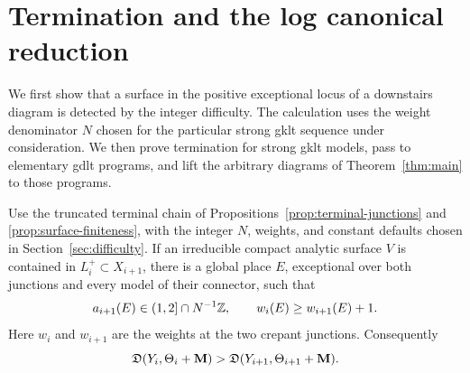 \section{Termination and the log canonical reduction}\label{sec:completion}

We first show that a surface in the positive exceptional locus of a
downstairs diagram is detected by the integer difficulty.  The calculation
uses the weight denominator \(N\) chosen for the particular strong gklt
sequence under consideration.  We then prove
termination for strong gklt models, pass to elementary gdlt programs, and
lift the arbitrary diagrams of Theorem~\ref{thm:main} to those programs.

\begin{lemma}\label{lem:positive-surface}
Use the truncated terminal chain of
Propositions~\ref{prop:terminal-junctions} and
\ref{prop:surface-finiteness}, with the integer \(N\), weights, and constant
defaults chosen in Section~\ref{sec:difficulty}.  If an irreducible compact
analytic surface \(V\) is contained in \(L_i^+\subset X_{i+1}\), there is
a global place \(E\), exceptional over both junctions and every model of
their connector, such that
\[
 a_{i+1}(E)\in(1,2]\cap N^{-1}\mathbb{Z},
 \qquad w_i(E)\geq w_{i+1}(E)+1.
\]
Here \(w_i\) and \(w_{i+1}\) are the weights at the two crepant junctions.
Consequently
\[
 \mathfrak D(Y_i,\Theta_i+\mathbf{M})
 >\mathfrak D(Y_{i+1},\Theta_{i+1}+\mathbf{M}).
\]
\end{lemma}

